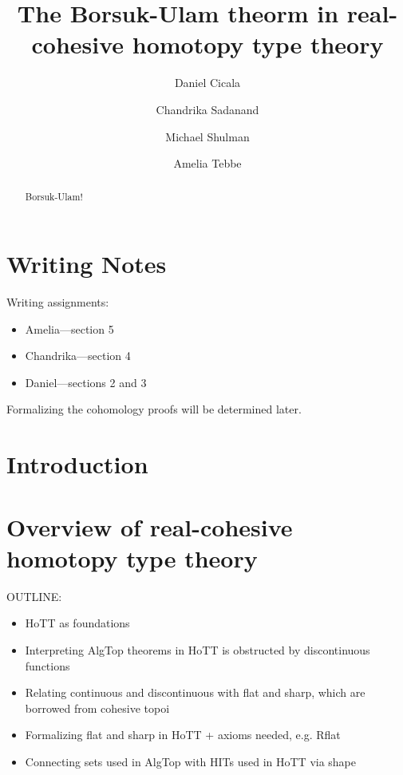 \documentclass{amsart}
\begin{document}
\title{%
        The Borsuk-Ulam theorm in real-cohesive homotopy
        type theory}   
\author{%
        Daniel Cicala \and Chandrika Sadanand \and Michael
        Shulman \and Amelia Tebbe}
\begin{abstract}
        Borsuk-Ulam!
\end{abstract}
\maketitle

\section*{Writing Notes}
\label{sec:writing_notes}

Writing assignments:
\begin{itemize}
\item Amelia---section 5
\item Chandrika---section 4
\item Daniel---sections 2 and 3
\end{itemize}

Formalizing the cohomology proofs will be determined later.

\section{Introduction}
\label{sec:intro}

\section{Overview of real-cohesive homotopy type theory}
\label{sec:rc-hott}

OUTLINE:
\begin{itemize}
\item
  HoTT as foundations
\item
  Interpreting AlgTop theorems in HoTT is obstructed by
  discontinuous functions
\item
  Relating continuous and discontinuous with flat and
  sharp, which are borrowed from cohesive topoi
\item
  Formalizing flat and sharp in HoTT + axioms needed,
  e.g. Rflat
\item
  Connecting sets used in AlgTop with HITs used in HoTT
  via shape
\end{itemize}
\end{document}
